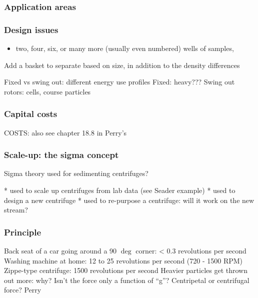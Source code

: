 \begin{frame}\frametitle{Application areas}
	
\end{frame}

\begin{frame}\frametitle{Design issues}
	\begin{itemize}
		\item	two, four, six, or many more (usually even numbered) wells of samples,
	\end{itemize}
	Add a basket to separate based on size, in addition to the density differences
	
		Fixed vs swing out: different energy use profiles
		Fixed: heavy???
		Swing out rotors: cells, course particles
	
\end{frame}

\begin{frame}\frametitle{Capital costs}
	COSTS: also see chapter 18.8 in Perry's
\end{frame}

\begin{frame}\frametitle{Scale-up: the sigma concept}
	Sigma theory used for sedimenting centrifuges?
	
	* used to scale up centrifuges from lab data (see Seader example)
	* used to design a new centrifuge
	* used to re-purpose a centrifuge: will it work on the new stream?
	
\end{frame}

\begin{frame}\frametitle{Principle}
	Back seat of a car going around a 90 $\deg$ corner: < 0.3 revolutions per second
	Washing machine at home: 12 to 25 revolutions per second (720 - 1500 RPM) 
	Zippe-type centrifuge: 1500 revolutions per second 
	Heavier particles get thrown out more: why? 
	Isn't the force only a function of ``g''?
	Centripetal or centrifugal force? Perry
	
	
\end{frame}


